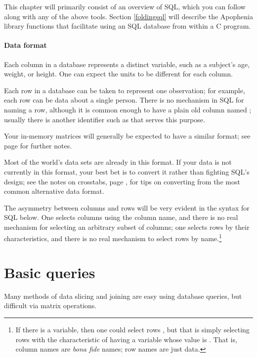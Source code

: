 This chapter will primarily consist of an overview of SQL, which you can
follow along with any of the above tools. Section \ref{foldingsql}
will describe the Apophenia library functions that facilitate using an
SQL database from within a C program.

\paragraph{Data format} Each column in a database represents a distinct
variable, such as a subject's age, weight, or height. One can expect the
units to be different for each column. 

Each row in a database can be taken to represent one observation; for
example, each row can be data about a single person. There is no
mechanism in SQL for naming a row, although it is common enough to
have a plain old column named ; usually there is
another identifier such as  that serves
this purpose.  

Your in-memory matrices will generally be expected to have a similar
format; see page \pageref{dataformats} for further notes.

Most of the world's data sets are already in this format. If your data 
is not currently in this format, your best bet is to convert it rather
than fighting SQL's design; see
the notes on crosstabs, page \pageref{crosstabs}, for tips on
converting from the most common alternative data format.

The asymmetry between columns and rows will be very
evident in the syntax for SQL below. 
One selects columns using the
column name, and there is no real mechanism for selecting an arbitrary
subset of columns; one selects rows by their characteristics, and there
is no real mechanism to select rows by name.\footnote{If there is a
 variable, then one could select rows , but that is simply selecting rows with the
characteristic of having a  variable whose value is
. That is, column names are {\it bona fide} names; row
names are just data.}



\section{Basic queries}
Many methods of data slicing and joining are easy using database queries,
but difficult via matrix operations.

